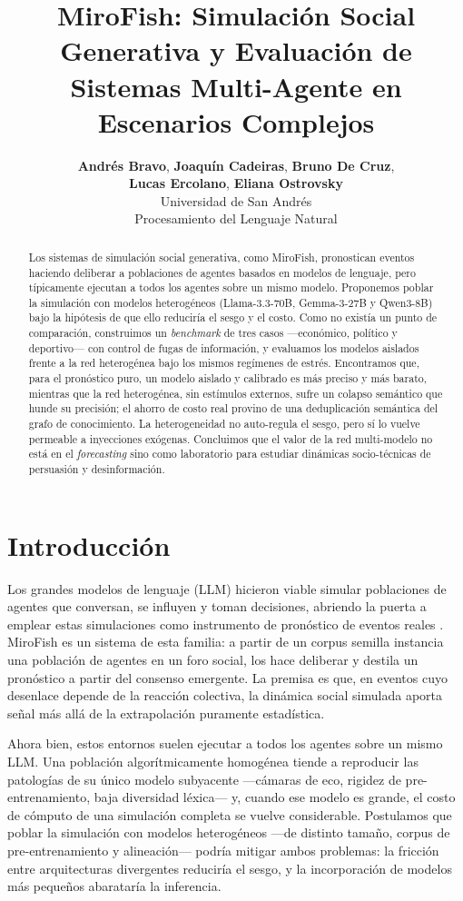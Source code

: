 \documentclass[11pt]{article}
\title{MiroFish: Simulación Social Generativa y Evaluación de \\ Sistemas Multi-Agente en Escenarios Complejos}
\author{
  \textbf{Andrés Bravo}, \textbf{Joaquín Cadeiras}, \textbf{Bruno De Cruz}, \\
  \textbf{Lucas Ercolano}, \textbf{Eliana Ostrovsky} \\
  Universidad de San Andrés \\
  \small{Procesamiento del Lenguaje Natural}
}
\begin{document}
\maketitle

\begin{abstract}
Los sistemas de simulación social generativa, como MiroFish, pronostican eventos haciendo deliberar a poblaciones de agentes basados en modelos de lenguaje, pero típicamente ejecutan a todos los agentes sobre un mismo modelo. Proponemos poblar la simulación con modelos heterogéneos (Llama-3.3-70B, Gemma-3-27B y Qwen3-8B) bajo la hipótesis de que ello reduciría el sesgo y el costo. Como no existía un punto de comparación, construimos un \textit{benchmark} de tres casos —económico, político y deportivo— con control de fugas de información, y evaluamos los modelos aislados frente a la red heterogénea bajo los mismos regímenes de estrés. Encontramos que, para el pronóstico puro, un modelo aislado y calibrado es más preciso y más barato, mientras que la red heterogénea, sin estímulos externos, sufre un colapso semántico que hunde su precisión; el ahorro de costo real provino de una deduplicación semántica del grafo de conocimiento. La heterogeneidad no auto-regula el sesgo, pero sí lo vuelve permeable a inyecciones exógenas. Concluimos que el valor de la red multi-modelo no está en el \textit{forecasting} sino como laboratorio para estudiar dinámicas socio-técnicas de persuasión y desinformación.
\end{abstract}

\section{Introducción}
\label{sec:intro}

Los grandes modelos de lenguaje (LLM) hicieron viable simular poblaciones de agentes que conversan, se influyen y toman decisiones, abriendo la puerta a emplear estas simulaciones como instrumento de pronóstico de eventos reales \citep{park2023generative, yang2024oasis}. MiroFish \citep{mirofish2025} es un sistema de esta familia: a partir de un corpus semilla instancia una población de agentes en un foro social, los hace deliberar y destila un pronóstico a partir del consenso emergente. La premisa es que, en eventos cuyo desenlace depende de la reacción colectiva, la dinámica social simulada aporta señal más allá de la extrapolación puramente estadística.

Ahora bien, estos entornos suelen ejecutar a todos los agentes sobre un mismo LLM. Una población algorítmicamente homogénea tiende a reproducir las patologías de su único modelo subyacente —cámaras de eco, rigidez de pre-entrenamiento, baja diversidad léxica— y, cuando ese modelo es grande, el costo de cómputo de una simulación completa se vuelve considerable. Postulamos que poblar la simulación con modelos heterogéneos —de distinto tamaño, corpus de pre-entrenamiento y alineación— podría mitigar ambos problemas: la fricción entre arquitecturas divergentes reduciría el sesgo, y la incorporación de modelos más pequeños abarataría la inferencia.
\end{document}

